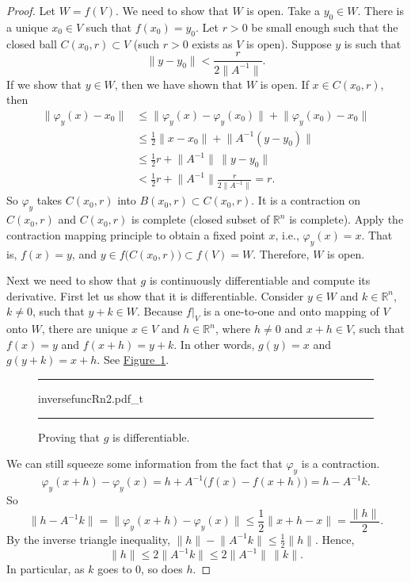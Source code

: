 \documentclass[12pt,openany]{book}
\newcommand{\snorm}[1]{\lVert {#1} \rVert}
\newcommand{\R}{{\mathbb{R}}}
\theoremstyle{plain}
\theoremstyle{remark}
\theoremstyle{definition}
\newenvironment{myfig}{%
\begin{figure}[h!t]
\noindent\rule{\textwidth}{0.5pt}\vspace{12pt}\par\centering}%
{\par\noindent\rule{\textwidth}{0.5pt}
\end{figure}}
\theoremstyle{exercise}
\theoremstyle{example}
\newcommand{\figureref}[1]{\hyperref[#1]{Figure~\ref*{#1}}}
\begin{document}
\begin{proof}
Let $W = f(V)$.  We need to show that $W$ is open.  Take a $y_0 \in W$.
There is a unique $x_0 \in V$ such that $f(x_0) = y_0$.
Let $r > 0$ be small enough such that the closed ball $C(x_0,r) \subset V$
(such $r > 0$ exists as $V$ is open).
Suppose $y$ is such that
\begin{equation*}
\snorm{y-y_0} <
\frac{r}{2\snorm{A^{-1}}} .
\end{equation*}
If we show that $y \in W$, then we have shown that $W$ is open.
If $x \in
C(x_0,r)$, then
\begin{equation*}
\begin{split}
\snorm{\varphi_y(x)-x_0}
& \leq
\snorm{\varphi_y(x)-\varphi_y(x_0)} +
\snorm{\varphi_y(x_0)-x_0} \\
& \leq
\frac{1}{2}\snorm{x-x_0} +
\snorm{A^{-1}(y-y_0)} \\
& \leq
\frac{1}{2}r +
\snorm{A^{-1}} \, \snorm{y-y_0} \\
& <
\frac{1}{2}r +
\snorm{A^{-1}}
\frac{r}{2\snorm{A^{-1}}} = r .
\end{split}
\end{equation*}
So $\varphi_y$ takes $C(x_0,r)$ into $B(x_0,r) \subset C(x_0,r)$.  It is a
contraction on $C(x_0,r)$ and $C(x_0,r)$ is complete (closed subset of $\R^n$
is complete).
Apply the contraction mapping principle to obtain a fixed point $x$,
i.e., $\varphi_y(x) = x$.  That is, $f(x) = y$, and $y \in
f\bigl(C(x_0,r)\bigr) \subset f(V) = W$.  Therefore, $W$ is open.

Next we need to show that $g$ is continuously differentiable and compute
its derivative.  First let us show that it is differentiable.
Consider $y \in W$ and $k \in \R^n$, $k\not= 0$, such that $y+k \in W$.
Because $f|_V$ is a one-to-one and onto mapping of $V$ onto $W$,
there are unique
$x \in V$ and $h \in \R^n$, where $h \not= 0$ and $x+h \in V$, such that
$f(x) = y$ and $f(x+h) = y+k$.
In other words, $g(y) = x$ and $g(y+k) = x+h$.  See
\figureref{fig:inversefuncRn2}.
\begin{myfig}
{inversefuncRn2.pdf_t}
\caption{Proving that $g$ is differentiable.\label{fig:inversefuncRn2}}
\end{myfig}

We can still
squeeze some information from the fact that $\varphi_y$ is a contraction.
\begin{equation*}
\varphi_y(x+h)-\varphi_y(x) = h + A^{-1} \bigl( f(x)-f(x+h) \bigr) = h - A^{-1} k .
\end{equation*}
So
\begin{equation*}
\snorm{h-A^{-1}k} = \snorm{\varphi_y(x+h)-\varphi_y(x)} \leq
\frac{1}{2}\snorm{x+h-x} = \frac{\snorm{h}}{2}.
\end{equation*}
By the inverse triangle inequality, $\snorm{h} - \snorm{A^{-1}k} \leq
\frac{1}{2}\snorm{h}$.
Hence,
\begin{equation*}
\snorm{h} \leq 2 \snorm{A^{-1}k} \leq 2 \snorm{A^{-1}} \, \snorm{k}.
\end{equation*}
In particular, as $k$ goes to $0$, so does $h$.


\end{proof}
\end{document}
